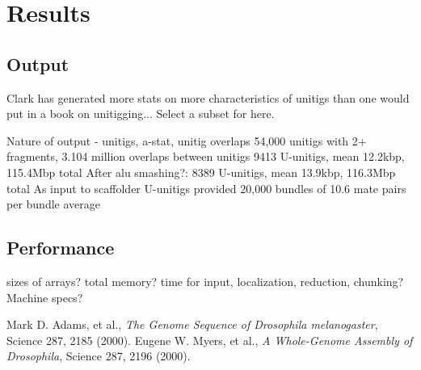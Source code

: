 \documentclass{article}
\begin{document}
\section{Results}
\subsection{Output}
  Clark has generated more stats on more characteristics of unitigs
than one would put in a book on unitigging... Select a subset for
here.

  Nature of output - unitigs, a-stat, unitig overlaps
    54,000 unitigs with 2+ fragments, 3.104 million overlaps between unitigs
    9413 U-unitigs, mean 12.2kbp, 115.4Mbp total
  After alu smashing?:
    8389 U-unitigs, mean 13.9kbp, 116.3Mbp total
  As input to scaffolder
    U-unitigs provided 20,000 bundles of 10.6 mate pairs per bundle average
\subsection{Performance}
  sizes of arrays? total memory? time for input, localization,
  reduction, chunking? Machine specs?

\begin{thebibliography}{plain}
   Mark D. Adams, et al., {\it The Genome Sequence of
  Drosophila melanogaster}, Science 287, 2185 (2000).
   Eugene W. Myers, et al., {\it A Whole-Genome Assembly of
  Drosophila}, Science 287, 2196 (2000).
\end{thebibliography}
\end{document}
